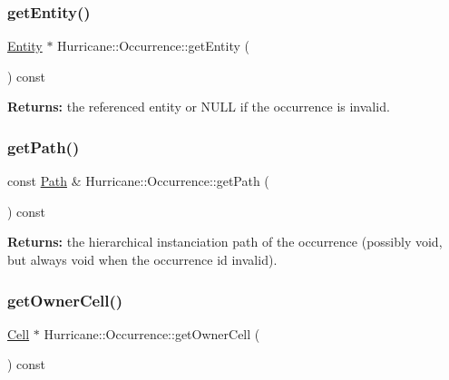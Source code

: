 \subsubsection{\texorpdfstring{get\+Entity()}{getEntity()}}
{\footnotesize\ttfamily \mbox{\hyperlink{classHurricane_1_1Entity}{Entity}} $\ast$ Hurricane\+::\+Occurrence\+::get\+Entity (\begin{DoxyParamCaption}{ }\end{DoxyParamCaption}) const\hspace{0.3cm}{\ttfamily [inline]}}

{\bfseries Returns\+:} the referenced entity or N\+U\+LL if the occurrence is invalid. \mbox{\label{classHurricane_1_1Occurrence_adeab556806a83e8cf3ad6ecc08f3a83e}} 
\subsubsection{\texorpdfstring{get\+Path()}{getPath()}}
{\footnotesize\ttfamily const \mbox{\hyperlink{classHurricane_1_1Path}{Path}} \& Hurricane\+::\+Occurrence\+::get\+Path (\begin{DoxyParamCaption}{ }\end{DoxyParamCaption}) const\hspace{0.3cm}{\ttfamily [inline]}}

{\bfseries Returns\+:} the hierarchical instanciation path of the occurrence (possibly void, but always void when the occurrence id invalid). \mbox{\label{classHurricane_1_1Occurrence_affced95f35617150b5811c3784b20d93}} 
\subsubsection{\texorpdfstring{get\+Owner\+Cell()}{getOwnerCell()}}
{\footnotesize\ttfamily \mbox{\hyperlink{classHurricane_1_1Cell}{Cell}} $\ast$ Hurricane\+::\+Occurrence\+::get\+Owner\+Cell (\begin{DoxyParamCaption}{ }\end{DoxyParamCaption}) const}

